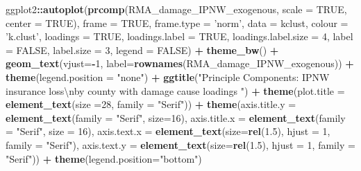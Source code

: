 \documentclass[]{article}
\newenvironment{Shaded}{\begin{snugshade}}{\end{snugshade}}
\newcommand{\CharTok}[1]{\textcolor[rgb]{0.31,0.60,0.02}{#1}}
\newcommand{\DataTypeTok}[1]{\textcolor[rgb]{0.13,0.29,0.53}{#1}}
\newcommand{\DecValTok}[1]{\textcolor[rgb]{0.00,0.00,0.81}{#1}}
\newcommand{\FloatTok}[1]{\textcolor[rgb]{0.00,0.00,0.81}{#1}}
\newcommand{\KeywordTok}[1]{\textcolor[rgb]{0.13,0.29,0.53}{\textbf{#1}}}
\newcommand{\NormalTok}[1]{#1}
\newcommand{\OperatorTok}[1]{\textcolor[rgb]{0.81,0.36,0.00}{\textbf{#1}}}
\newcommand{\OtherTok}[1]{\textcolor[rgb]{0.56,0.35,0.01}{#1}}
\newcommand{\StringTok}[1]{\textcolor[rgb]{0.31,0.60,0.02}{#1}}
\begin{document}
\begin{Shaded}
\begin{Highlighting}[]
\NormalTok{ggplot2}\OperatorTok{::}\KeywordTok{autoplot}\NormalTok{(}\KeywordTok{prcomp}\NormalTok{(RMA_damage_IPNW_exogenous, }\DataTypeTok{scale =} \OtherTok{TRUE}\NormalTok{, }\DataTypeTok{center =} \OtherTok{TRUE}\NormalTok{), }\DataTypeTok{frame =} \OtherTok{TRUE}\NormalTok{, }\DataTypeTok{frame.type =} \StringTok{'norm'}\NormalTok{, }\DataTypeTok{data =}\NormalTok{ kclust, }\DataTypeTok{colour =} \StringTok{'k.clust'}\NormalTok{, }\DataTypeTok{loadings =} \OtherTok{TRUE}\NormalTok{, }\DataTypeTok{loadings.label =} \OtherTok{TRUE}\NormalTok{, }\DataTypeTok{loadings.label.size  =} \DecValTok{4}\NormalTok{, }\DataTypeTok{label =} \OtherTok{FALSE}\NormalTok{, }\DataTypeTok{label.size =} \DecValTok{3}\NormalTok{, }\DataTypeTok{legend =} \OtherTok{FALSE}\NormalTok{)  }\OperatorTok{+}\StringTok{ }\KeywordTok{theme_bw}\NormalTok{()   }\OperatorTok{+}\StringTok{ }\KeywordTok{geom_text}\NormalTok{(}\DataTypeTok{vjust=}\OperatorTok{-}\DecValTok{1}\NormalTok{, }\DataTypeTok{label=}\KeywordTok{rownames}\NormalTok{(RMA_damage_IPNW_exogenous)) }\OperatorTok{+}\StringTok{ }\KeywordTok{theme}\NormalTok{(}\DataTypeTok{legend.position =} \StringTok{"none"}\NormalTok{) }\OperatorTok{+}\StringTok{ }\KeywordTok{ggtitle}\NormalTok{(}\StringTok{"Principle Components: IPNW insurance loss}\CharTok{\textbackslash{}n}\StringTok{by county with damage cause loadings "}\NormalTok{) }\OperatorTok{+}\StringTok{ }\KeywordTok{theme}\NormalTok{(}\DataTypeTok{plot.title =} \KeywordTok{element_text}\NormalTok{(}\DataTypeTok{size =}\DecValTok{28}\NormalTok{, }\DataTypeTok{family =} \StringTok{"Serif"}\NormalTok{)) }\OperatorTok{+}\StringTok{ }\KeywordTok{theme}\NormalTok{(}\DataTypeTok{axis.title.y =} \KeywordTok{element_text}\NormalTok{(}\DataTypeTok{family =} \StringTok{"Serif"}\NormalTok{, }\DataTypeTok{size=}\DecValTok{16}\NormalTok{), }\DataTypeTok{axis.title.x =} \KeywordTok{element_text}\NormalTok{(}\DataTypeTok{family =} \StringTok{"Serif"}\NormalTok{, }\DataTypeTok{size =} \DecValTok{16}\NormalTok{), }\DataTypeTok{axis.text.x =} \KeywordTok{element_text}\NormalTok{(}\DataTypeTok{size=}\KeywordTok{rel}\NormalTok{(}\FloatTok{1.5}\NormalTok{), }\DataTypeTok{hjust =} \DecValTok{1}\NormalTok{, }\DataTypeTok{family =} \StringTok{"Serif"}\NormalTok{), }\DataTypeTok{axis.text.y =} \KeywordTok{element_text}\NormalTok{(}\DataTypeTok{size=}\KeywordTok{rel}\NormalTok{(}\FloatTok{1.5}\NormalTok{), }\DataTypeTok{hjust =} \DecValTok{1}\NormalTok{, }\DataTypeTok{family =} \StringTok{"Serif"}\NormalTok{))  }\OperatorTok{+}\StringTok{ }\KeywordTok{theme}\NormalTok{(}\DataTypeTok{legend.position=}\StringTok{"bottom"}\NormalTok{) }
\end{Highlighting}
\end{Shaded}
\end{document}
